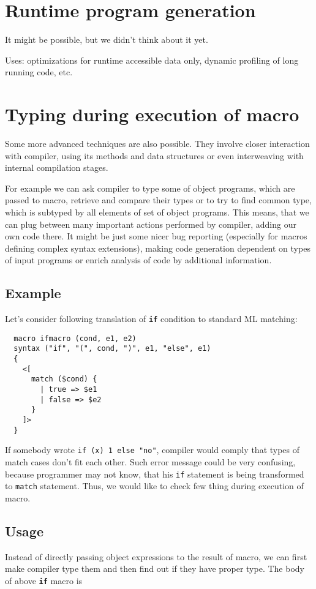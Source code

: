 \documentclass{llncs}
\newcommand{\kw}[1]{{\tt \bf #1}}
\begin{document}
\section{Runtime program generation}
It might be possible, but we didn't think about it yet.

Uses: optimizations for runtime accessible data only,
dynamic profiling of long running code, etc.

\section{Typing during execution of macro}
Some more advanced techniques are also possible. They involve closer
interaction with compiler, using its methods and data structures
or even interweaving with internal compilation stages.

For example we can ask compiler to type some of object programs,
which are passed to macro, retrieve and compare their types or to try 
to find common type, which is subtyped by all elements of set of
object programs. This means, that we can plug between many important 
actions performed by compiler, adding our own code there. It might
be just some nicer bug reporting (especially for macros defining
complex syntax extensions), making code generation dependent on
types of input programs or enrich analysis of code by additional
information.

\subsection{Example}
Let's consider following translation of \kw{if} condition to standard
ML matching:

\begin{verbatim}
  macro ifmacro (cond, e1, e2)
  syntax ("if", "(", cond, ")", e1, "else", e1) 
  {
    <[ 
      match ($cond) {
        | true => $e1
        | false => $e2
      }       
    ]>
  }
\end{verbatim} %

If somebody wrote \verb,if (x) 1 else "no",, compiler would comply
that types of match cases don't fit each other. Such error message could
be very confusing, because programmer may not know, that his \verb,if,
statement is being transformed to \verb,match, statement. Thus, we would
like to check few thing during execution of macro.

\subsection{Usage}
Instead of directly passing object expressions to the result of macro, we
can first make compiler type them and then find out if they have proper
type. The body of above \kw{if} macro is
\end{document}
